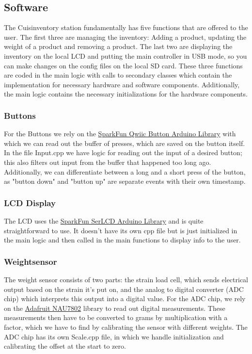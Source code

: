 \documentclass{article}
\begin{document}
\subsection{Software}
The Cuisinventory station fundamentally has five functions that are offered to the user. The first three are managing the inventory: Adding a product, updating the weight of a product and removing a product.
The last two are displaying the inventory on the local LCD and putting the main controller in USB mode, so you can make changes on the config files on the local SD card.
These three functions are coded in the main logic with calls to secondary classes which contain the implementation for necessary hardware and software components.
Additionally, the main logic contains the necessary initializations for the hardware components.
\subsubsection{Buttons}
For the Buttons we rely on the \href{https://github.com/sparkfun/SparkFun_Qwiic_Button_Arduino_Library}{SparkFun Qwiic Button Arduino Library} with which we can read out the buffer of presses, which are saved on the button itself.
In the file Input.cpp we have logic for reading out the input of a desired button; this also filters out input from the buffer that happened too long ago.
Additionally, we can differentiate between a long and a short press of the button, as "button down" and "button up" are separate events with their own timestamp.
\subsubsection{LCD Display}
The LCD uses the \href{https://github.com/sparkfun/SparkFun_SerLCD_Arduino_Library}{SparkFun SerLCD Arduino Library} and is quite straightforward to use. It doesn't have its own cpp file but is just initialized in the main logic
and then called in the main functions to display info to the user.
\subsubsection{Weightsensor}
The weight sensor consists of two parts: the strain load cell, which sends electrical output based on the strain it's put on, and the analog to digital converter (ADC chip) which interprets this output into a digital value.
For the ADC chip, we rely on the \href{https://github.com/adafruit/Adafruit_NAU7802}{Adafruit NAU7802} library to read out digital measurements.
These measurements then have to be converted to grams by multiplication with a factor, which we have to find by calibrating the sensor with different weights.
The ADC chip has its own Scale.cpp file, in which we handle initialization and calibrating the offset at the start to zero.
\end{document}
